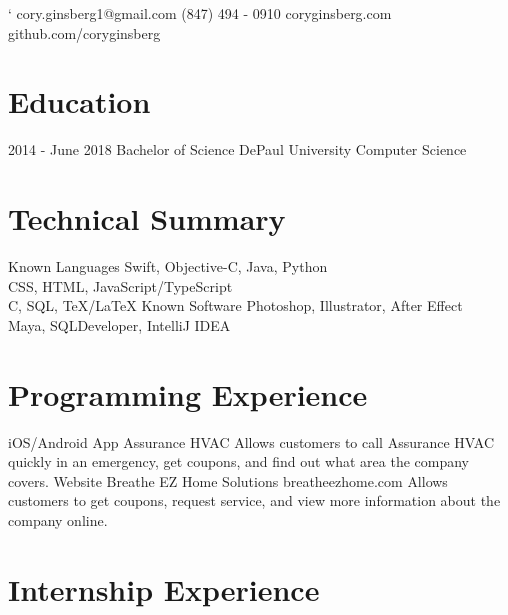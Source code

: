 \documentclass[]{resume-class}
\begin{document}
`
       {cory.ginsberg1@gmail.com \textbullet \hspace{0.01cm} (847) 494 - 0910}
       {coryginsberg.com \textbullet \hspace{0.01cm} github.com/coryginsberg}

\section{Education}
    \begin{entrylist}
        \entry
            {2014 - June 2018}
            {Bachelor of Science}
            {DePaul University}
            {Computer Science}
    \end{entrylist}


\section{Technical Summary}
    \begin{entrylist}
        \entry
            {Known Languages}
            {Swift, Objective-C, Java, Python\\CSS, HTML, JavaScript/TypeScript\\ C, SQL, TeX/LaTeX}
            {}
            {}
        \entry
            {Known Software}
            {Photoshop, Illustrator, After Effect\\Maya, SQLDeveloper, IntelliJ IDEA} %
            {}
            {}
    \end{entrylist}

\section{Programming Experience}
    \begin{entrylist}
        \entry
            {iOS/Android App}
            {Assurance HVAC}
            {}
            {Allows customers to call Assurance HVAC quickly in an emergency, get coupons, and find out what area the company covers.}
        \entry
            {Website}
            {Breathe EZ Home Solutions}
            {breatheezhome.com}
            {Allows customers to get coupons, request service, and view more information about the company online.}
    \end{entrylist}

\section{Internship Experience}
\end{document}
